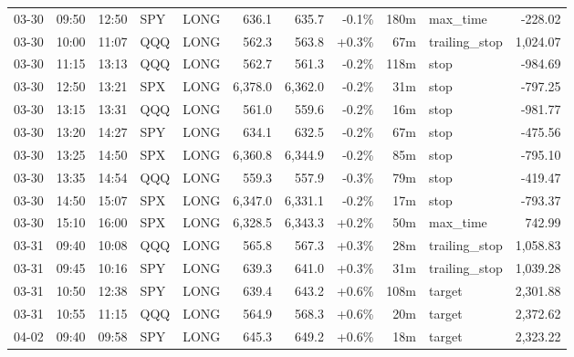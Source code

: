 \documentclass[11pt,a4paper,twoside]{article}
\begin{document}
\begin{center}
\begin{longtable}{>{\color{txtmain}}l l l l l r r r r >{\color{txtmain}}l r}
03-30 & 09:50 & 12:50 & SPY & LONG & 636.1 & 635.7 & \textcolor{lossred}{-0.1\%} & 180m & max\_time & \textcolor{lossred}{-228.02} \\
03-30 & 10:00 & 11:07 & QQQ & LONG & 562.3 & 563.8 & \textcolor{wingreen}{+0.3\%} & 67m & trailing\_stop & \textcolor{wingreen}{1,024.07} \\
03-30 & 11:15 & 13:13 & QQQ & LONG & 562.7 & 561.3 & \textcolor{lossred}{-0.2\%} & 118m & stop & \textcolor{lossred}{-984.69} \\
03-30 & 12:50 & 13:21 & SPX & LONG & 6,378.0 & 6,362.0 & \textcolor{lossred}{-0.2\%} & 31m & stop & \textcolor{lossred}{-797.25} \\
03-30 & 13:15 & 13:31 & QQQ & LONG & 561.0 & 559.6 & \textcolor{lossred}{-0.2\%} & 16m & stop & \textcolor{lossred}{-981.77} \\
03-30 & 13:20 & 14:27 & SPY & LONG & 634.1 & 632.5 & \textcolor{lossred}{-0.2\%} & 67m & stop & \textcolor{lossred}{-475.56} \\
03-30 & 13:25 & 14:50 & SPX & LONG & 6,360.8 & 6,344.9 & \textcolor{lossred}{-0.2\%} & 85m & stop & \textcolor{lossred}{-795.10} \\
03-30 & 13:35 & 14:54 & QQQ & LONG & 559.3 & 557.9 & \textcolor{lossred}{-0.3\%} & 79m & stop & \textcolor{lossred}{-419.47} \\
03-30 & 14:50 & 15:07 & SPX & LONG & 6,347.0 & 6,331.1 & \textcolor{lossred}{-0.2\%} & 17m & stop & \textcolor{lossred}{-793.37} \\
03-30 & 15:10 & 16:00 & SPX & LONG & 6,328.5 & 6,343.3 & \textcolor{wingreen}{+0.2\%} & 50m & max\_time & \textcolor{wingreen}{742.99} \\
03-31 & 09:40 & 10:08 & QQQ & LONG & 565.8 & 567.3 & \textcolor{wingreen}{+0.3\%} & 28m & trailing\_stop & \textcolor{wingreen}{1,058.83} \\
03-31 & 09:45 & 10:16 & SPY & LONG & 639.3 & 641.0 & \textcolor{wingreen}{+0.3\%} & 31m & trailing\_stop & \textcolor{wingreen}{1,039.28} \\
03-31 & 10:50 & 12:38 & SPY & LONG & 639.4 & 643.2 & \textcolor{wingreen}{+0.6\%} & 108m & target & \textcolor{wingreen}{2,301.88} \\
03-31 & 10:55 & 11:15 & QQQ & LONG & 564.9 & 568.3 & \textcolor{wingreen}{+0.6\%} & 20m & target & \textcolor{wingreen}{2,372.62} \\
04-02 & 09:40 & 09:58 & SPY & LONG & 645.3 & 649.2 & \textcolor{wingreen}{+0.6\%} & 18m & target & \textcolor{wingreen}{2,323.22} \\

\end{longtable}
\end{center}
\end{document}
